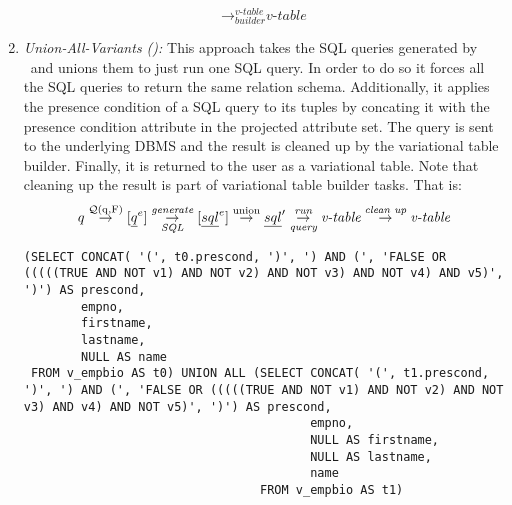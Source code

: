 \begin{enumerate}
\[\mathrel{\mathop{\rightarrow}^{\mathrm{\textit{v-table}}}_{\mathrm{\textit{builder}}}} \textit{v-table}
\]
%
%
\item
\emph{Union-All-Variants (\uav):}
This approach takes the SQL queries generated by \ubf\ and 
unions them to just run one SQL query. In order to do so it 
forces all the SQL queries to return the same relation schema.
Additionally, it applies the presence condition of a SQL query
to its tuples by concating it with the presence condition attribute
in the projected attribute set.
The query is sent to the underlying
DBMS and the result is cleaned up by the variational table builder. Finally, it is 
returned to the user as a variational table. Note that cleaning up
the result is part of variational table builder tasks.
That is:
%
\[\vQ \mathrel{\mathop{\rightarrow}^{\mathrm{\qGroup \vQ}}} [ \annot [\dimMeta] {\pQ} ] 
\mathrel{\mathop{\rightarrow}^{\mathrm{\textit{generate}}}_{\mathrm{\textit{SQL}}}} [ \annot [\dimMeta] {\sqlQ} ]
\mathrel{\mathop{\rightarrow}^{\mathrm{union}}} {\VVal \sqlQ}
\mathrel{\mathop{\rightarrow}^{\mathrm{\textit{run}}}_{\mathrm{\textit{query}}}} \textit{v-table}
\mathrel{\mathop{\rightarrow}^{\mathrm{\textit{clean up}}}} \textit{v-table}
\]
%
\begin{example}
\label{eg:uav}
 \begin{lstlisting}[basicstyle=\footnotesize\ttfamily,columns=flexible,lineskip=0.5\baselineskip]
 (SELECT CONCAT( '(', t0.prescond, ')', ') AND (', 'FALSE OR (((((TRUE AND NOT v1) AND NOT v2) AND NOT v3) AND NOT v4) AND v5)', ')') AS prescond,
        empno,
        firstname,
        lastname,
        NULL AS name
 FROM v_empbio AS t0) UNION ALL (SELECT CONCAT( '(', t1.prescond, ')', ') AND (', 'FALSE OR (((((TRUE AND NOT v1) AND NOT v2) AND NOT v3) AND v4) AND NOT v5)', ')') AS prescond,
                                        empno,
                                        NULL AS firstname,
                                        NULL AS lastname,
                                        name
                                 FROM v_empbio AS t1)
 \end{lstlisting}


\end{example}
\end{enumerate}
